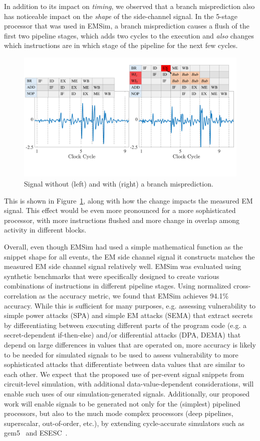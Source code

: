 In addition to its impact on \emph{timing}, we observed that a branch misprediction also has noticeable impact on the \emph{shape} of the side-channel signal. In the 5-stage processor that was used in EMSim, a branch misprediction causes a flush of the first two pipeline stages, which adds two cycles to the execution and \emph{also} changes which instructions are in which stage of the pipeline for the next few cycles.
\begin{figure}
	\includegraphics[width=0.5\columnwidth,clip]{figure/mise2.pdf}
\vspace{-0.3in}
	\caption{Signal without (left) and with (right) a branch misprediction.}
	\label{fig:mis}
   \vspace{-0.1in}
\end{figure}
 This is shown in Figure~\ref{fig:mis}, along with how the change impacts the measured EM signal.
This effect would be even more pronounced for a more sophisticated processor, with more instructions flushed and more change in overlap among activity in different blocks.

Overall, even though EMSim had used a simple mathematical function as the snippet shape for all events, the EM side channel signal it constructs matches the measured EM side channel signal relatively well. EMSim was evaluated using synthetic benchmarks that were specifically designed to create various combinations of instructions in different pipeline stages. Using normalized cross-correlation as the accuracy metric, we found that EMSim achieves 94.1\% accuracy. While this is sufficient for many purposes, e.g. assessing vulnerability to simple power attacks (SPA) and simple EM attacks (SEMA) that extract secrets by differentiating between executing different parts of the program code (e.g. a secret-dependent if-then-else) and/or differential attacks (DPA, DEMA) that depend on large differences in values that are operated on, more accuracy is likely to be needed for simulated signals to be used to assess vulnerability to more sophisticated attacks that differentiate between data values that are similar to each other. We expect that the proposed use of per-event signal snippets from circuit-level simulation, with additional data-value-dependent considerations, will enable such uses of our simulation-generated signals. Additionally, our proposed work will enable signals to be generated not only for the (simplest) pipelined processors, but also to the much mode complex processors (deep pipelines, superscalar, out-of-order, etc.), by extending cycle-accurate simulators such as gem5~\cite{Binkert:2011:GS:2024716.2024718} and ESESC~\cite{esesc}.

